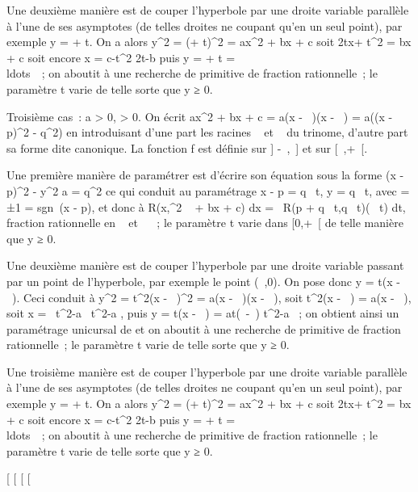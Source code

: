\documentclass[]{article}
\begin{document}
Une deuxième manière est de couper l'hyperbole \Gamma par une droite variable
parallèle à l'une de ses asymptotes (de telles droites ne coupant \Gamma
qu'en un seul point), par exemple y = \sqrtax + t. On
a alors y^2 = (\sqrtax + t)^2 =
ax^2 + bx + c soit 2tx\sqrta +
t^2 = bx + c soit encore x = c-t^2
\over 2t\sqrta-b puis y =
\sqrtax + t =
\\ldots~~; on
aboutit à une recherche de primitive de fraction rationnelle~; le
paramètre t varie de telle sorte que y ≥ 0.

Troisième cas~: a \textgreater{} 0, \Delta \textgreater{} 0. On écrit
ax^2 + bx + c = a(x - \alpha~)(x - \beta~) = a((x - p)^2 -
q^2) en introduisant d'une part les racines \alpha~ et \beta~ du
trinome, d'autre part sa forme dite canonique. La fonction f est définie
sur {]} -\infty~,\alpha~{]} et sur {[}\beta~,+\infty~{[}.

Une première manière de paramétrer \Gamma est d'écrire son équation sous la
forme (x - p)^2 - y^2 \over a =
q^2 ce qui conduit au paramétrage x - p =
q\epsilon\mathrmch~ t, y =
q\sqrta\mathrmsh~
t, avec \epsilon = ±1 = sgn~(x - p), et donc à
\int  R(x,\sqrtax^2 ~
+ bx + c) dx =\int ~ R(p +
q\epsilon\mathrmch~
t,q\sqrta\mathrmsh~
t)(\epsilonq\mathrmsh~ t) dt,
fraction rationnelle en
\mathrmsh~ et
\mathrmch~ ~; le paramètre t
varie dans {[}0,+\infty~{[} de telle manière que y ≥ 0.

Une deuxième manière est de couper l'hyperbole \Gamma par une droite variable
passant par un point de l'hyperbole, par exemple le point (\alpha~,0). On pose
donc y = t(x - \alpha~). Ceci conduit à y^2 = t^2(x -
\alpha~)^2 = a(x - \alpha~)(x - \beta~), soit t^2(x - \alpha~) = a(x - \beta~),
soit x = \alpha~t^2-a\beta~ \over t^2-a ,
puis y = t(x - \alpha~) = at(\beta~-\alpha~) \over t^2-a ~;
on obtient ainsi un paramétrage unicursal de \Gamma et on aboutit à une
recherche de primitive de fraction rationnelle~; le paramètre t varie de
telle sorte que y ≥ 0.

Une troisième manière est de couper l'hyperbole \Gamma par une droite
variable parallèle à l'une de ses asymptotes (de telles droites ne
coupant \Gamma qu'en un seul point), par exemple y =
\sqrtax + t. On a alors y^2 =
(\sqrtax + t)^2 = ax^2 + bx + c
soit 2tx\sqrta + t^2 = bx + c soit encore
x = c-t^2 \over
2t\sqrta-b puis y = \sqrtax + t
= \\ldots~~; on
aboutit à une recherche de primitive de fraction rationnelle~; le
paramètre t varie de telle sorte que y ≥ 0.

{[}
{[}
{[}
{[}
\end{document}
